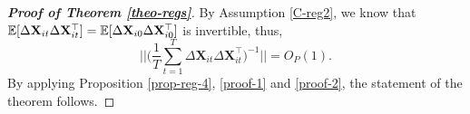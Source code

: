 \documentclass[a4paper,12pt]{article}
\begin{document}
\begin{proof}[\textnormal{\textbf{Proof of Theorem \ref{theo-regs}}}]
By Assumption \ref{C-reg2}, we know that $\mathbb{E} [\Delta \mathbf{X}_{it} \Delta \mathbf{X}_{it}^\top] = \mathbb{E} [\Delta \mathbf{X}_{i0} \Delta \mathbf{X}_{i0}^\top]$ is invertible, thus, 
\[\Bigg| \Bigg| \Big(\frac{1}{T}\sum_{t=1}^T\Delta \mathbf{X}_{it} \Delta \mathbf{X}_{it}^\top\Big)^{-1}\Bigg|\Bigg| = O_P(1).\]
By applying Proposition \ref{prop-reg-4}, \eqref{proof-1} and \eqref{proof-2}, the statement of the theorem follows.
\end{proof}
\end{document}
